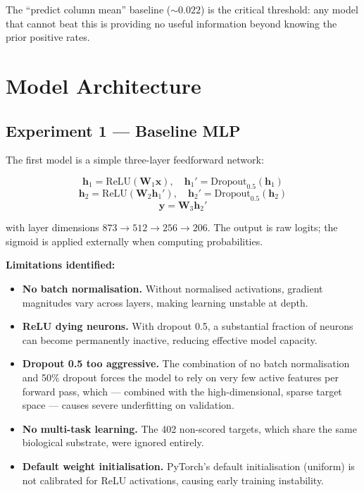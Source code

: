 \documentclass[12pt, a4paper]{article}
\begin{document}
The ``predict column mean'' baseline ($\sim 0.022$) is the critical threshold: any model that cannot beat this is providing no useful information beyond knowing the prior positive rates.

\section{Model Architecture}

\subsection{Experiment 1 — Baseline MLP}

The first model is a simple three-layer feedforward network:

\begin{equation}
\mathbf{h}_1 = \text{ReLU}(\mathbf{W}_1 \mathbf{x}), \quad
\mathbf{h}_1' = \text{Dropout}_{0.5}(\mathbf{h}_1)
\end{equation}
\begin{equation}
\mathbf{h}_2 = \text{ReLU}(\mathbf{W}_2 \mathbf{h}_1'), \quad
\mathbf{h}_2' = \text{Dropout}_{0.5}(\mathbf{h}_2)
\end{equation}
\begin{equation}
\hat{\mathbf{y}} = \mathbf{W}_3 \mathbf{h}_2'
\end{equation}

with layer dimensions $873 \to 512 \to 256 \to 206$. The output is raw logits; the sigmoid is applied externally when computing probabilities.

\textbf{Limitations identified:}

\begin{itemize}
    \item \textbf{No batch normalisation.} Without normalised activations, gradient magnitudes vary across layers, making learning unstable at depth.
    \item \textbf{ReLU dying neurons.} With dropout 0.5, a substantial fraction of neurons can become permanently inactive, reducing effective model capacity.
    \item \textbf{Dropout 0.5 too aggressive.} The combination of no batch normalisation and 50\% dropout forces the model to rely on very few active features per forward pass, which — combined with the high-dimensional, sparse target space — causes severe underfitting on validation.
    \item \textbf{No multi-task learning.} The 402 non-scored targets, which share the same biological substrate, were ignored entirely.
    \item \textbf{Default weight initialisation.} PyTorch's default initialisation (uniform) is not calibrated for ReLU activations, causing early training instability.
\end{itemize}
\end{document}
